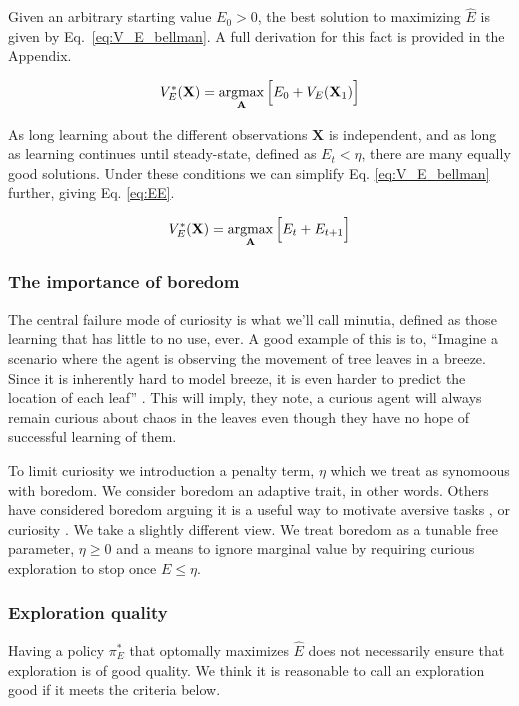 
Given an arbitrary starting value $E_0 > 0$, the best solution to maximizing $\hat E$ is given by Eq.~\ref{eq:V_E_bellman}. A full derivation for this fact is provided in the Appendix. 


\begin{equation}
	\label{eq:V_E_bellman} 
	V_E^{*}(\mathbf{X}) = \operatorname*{argmax}_{\mathbf{A}} \Big [ E_0 + V_E(\mathbf{X}_1) \Big ]
\end{equation}

As long learning about the different observations $\mathbf{X}$ is independent, and as long as learning continues until steady-state, defined as $E_t < \eta$, there are many equally good solutions. Under these conditions we can simplify Eq. \ref{eq:V_E_bellman} further, giving Eq. \ref{eq:EE}. 

\begin{equation}
	\label{eq:EE} 
	V_E^{*}(\mathbf{X}) = \operatorname*{argmax}_{\mathbf{A}} \Big [ E_t + E_{t+1} \Big ]
\end{equation}

\subsubsection*{The importance of boredom}
The central failure mode of curiosity is what we'll call minutia, defined as those learning that has little to no use, ever. A good example of this is to, ``Imagine a scenario where the agent is observing the movement of tree leaves in a breeze. Since it is inherently hard to model breeze, it is even harder to predict the location of each leaf'' \cite{Pathak2017}. This will imply, they note, a curious agent will always remain curious about chaos in the leaves even though they have no hope of successful learning of them.

To limit curiosity we introduction a penalty term, $\eta$ which we treat as synomoous with boredom. We consider boredom an adaptive trait, in other words. Others have considered boredom arguing it is a useful way to motivate aversive tasks \citep{Bench2013}, or curiosity \cite{Loewenstein1994}. We take a slightly different view. We treat boredom as a tunable free parameter, $\eta \ge 0$ and a means to ignore marginal value by requiring curious exploration to stop once $E \le \eta$. 


\subsubsection*{Exploration quality}
Having a policy $\pi_E^*$ that optomally maximizes $\hat E$ does not necessarily ensure that exploration is of good quality. We think it is reasonable to call an exploration good if it meets the criteria below. 

